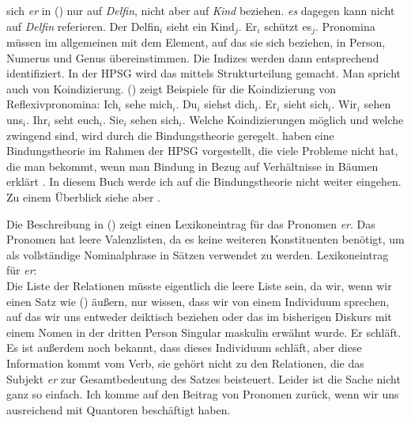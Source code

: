 sich \emph{er} in () nur auf \emph{Delfin}, nicht aber auf \emph{Kind}
beziehen. \emph{es} dagegen kann nicht auf \emph{Delfin} referieren.
\ea
Der Delfin$_i$ sieht ein Kind$_j$. Er$_i$ schützt es$_j$.
\z
Pronomina müssen im allgemeinen mit dem Element, auf das sie sich beziehen, in Person,
Numerus und Genus übereinstimmen. Die Indizes werden dann entsprechend identifiziert.
In der HPSG wird das mittels Strukturteilung gemacht. Man spricht auch von Koindizierung.
() zeigt Beispiele für die Koindizierung von Reflexivpronomina:
\eal
\ex Ich$_i$ sehe mich$_i$.
\ex Du$_i$ siehst dich$_i$.
\ex Er$_i$ sieht sich$_i$.
\ex Wir$_i$ sehen uns$_i$.
\ex Ihr$_i$ seht euch$_i$.
\ex Sie$_i$ sehen sich$_i$.
\zl
Welche Koindizierungen möglich und welche zwingend sind, wird durch die Bindungstheorie
geregelt. \citet{PS92a,ps2} haben eine Bindungstheorie im Rahmen der HPSG vorgestellt, die viele Probleme
nicht hat, die man bekommt, wenn man Bindung in Bezug auf Verhältnisse in Bäumen erklärt \citep{Wechsler99a,MS98a}. In diesem Buch werde
ich auf die Bindungstheorie nicht weiter eingehen. Zu einem Überblick siehe aber
.

Die Beschreibung in () zeigt einen Lexikoneintrag für das Pronomen \emph{er}. Das Pronomen
hat leere Valenzlisten, da es keine weiteren Konstituenten benötigt, um als vollständige
Nominalphrase in Sätzen verwendet zu werden.
\eas
\label{le-er}%
Lexikoneintrag für \emph{er}:\\
\zs
Die Liste der Relationen müsste eigentlich die leere Liste sein, da wir, wenn wir einen Satz wie () äußern, nur
wissen, dass wir von einem Individuum sprechen, auf das wir uns entweder deiktisch beziehen oder das
im bisherigen Diskurs mit einem Nomen in der dritten Person Singular maskulin erwähnt wurde.
\ea
Er schläft.
\z
Es ist außerdem noch bekannt, dass dieses Individuum schläft, aber diese Information kommt vom Verb, sie
gehört nicht zu den Relationen, die das Subjekt \emph{er} zur Gesamtbedeutung des Satzes
beisteuert. Leider ist die Sache nicht ganz so einfach. Ich komme auf den Beitrag von Pronomen
zurück, wenn wir uns ausreichend mit Quantoren beschäftigt haben.

